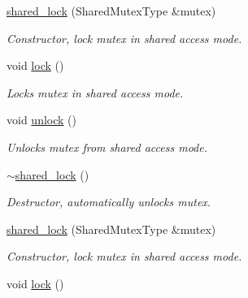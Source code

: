 \begin{DoxyCompactItemize}
\item 
\hyperlink{classstd_1_1shared__lock_ad98172785abb3cf717e758dfe033798e}{shared\+\_\+lock} (Shared\+Mutex\+Type \&mutex)
\begin{DoxyCompactList}\small\item\em Constructor, lock mutex in shared access mode. \end{DoxyCompactList}\item 
\mbox{\label{classstd_1_1shared__lock_a42150925d58f5e4a11de9731aaccabc3}} 
void \hyperlink{classstd_1_1shared__lock_a42150925d58f5e4a11de9731aaccabc3}{lock} ()
\begin{DoxyCompactList}\small\item\em Locks mutex in shared access mode. \end{DoxyCompactList}\item 
\mbox{\label{classstd_1_1shared__lock_ae84b24e0f1b3c6bf8e8ff24af779450e}} 
void \hyperlink{classstd_1_1shared__lock_ae84b24e0f1b3c6bf8e8ff24af779450e}{unlock} ()
\begin{DoxyCompactList}\small\item\em Unlocks mutex from shared access mode. \end{DoxyCompactList}\item 
\mbox{\label{classstd_1_1shared__lock_a0c954081592f905fa65b0f45c4c06100}} 
\hyperlink{classstd_1_1shared__lock_a0c954081592f905fa65b0f45c4c06100}{$\sim$shared\+\_\+lock} ()
\begin{DoxyCompactList}\small\item\em Destructor, automatically unlocks mutex. \end{DoxyCompactList}\item 
\hyperlink{classstd_1_1shared__lock_ad98172785abb3cf717e758dfe033798e}{shared\+\_\+lock} (Shared\+Mutex\+Type \&mutex)
\begin{DoxyCompactList}\small\item\em Constructor, lock mutex in shared access mode. \end{DoxyCompactList}\item 
\mbox{\label{classstd_1_1shared__lock_a42150925d58f5e4a11de9731aaccabc3}} 
void \hyperlink{classstd_1_1shared__lock_a42150925d58f5e4a11de9731aaccabc3}{lock} ()

\end{DoxyCompactItemize}
